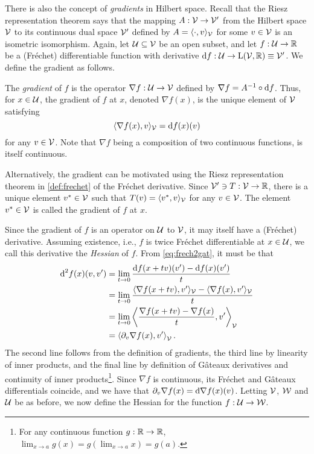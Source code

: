 There is also the concept of \emph{gradients} in Hilbert space.
Recall that the Riesz representation theorem says that the mapping $A:{\mathcal V}\to{\mathcal V}'$ from the Hilbert space ${\mathcal V}$ to its continuous dual space ${\mathcal V}'$ defined by $A = \langle\cdot,v\rangle_{\mathcal V}$ for some $v\in{\mathcal V}$ is an isometric isomorphism.
Again, let ${\mathcal U} \subseteq {\mathcal V}$ be an open subset, and let $f:{\mathcal U}\to\mathbb{R}$ be a (Fréchet) differentiable function with derivative $\text{d} f: {\mathcal U} \to \text{L}({\mathcal V},\mathbb{R}) \equiv {\mathcal V}'$.
We define the gradient as follows.

\begin{definition}
  The \emph{gradient} of $f$ is the operator $\nabla f: {\mathcal U} \to {\mathcal V}$ defined by $\nabla f = A^{-1} \circ \text{d} f$.
  Thus, for $x \in {\mathcal U}$, the gradient of $f$ at $x$, denoted $\nabla f(x)$, is the unique element of ${\mathcal V}$ satisfying
  \[
    \langle\nabla f(x), v\rangle_{\mathcal V} = \text{d} f(x)(v)
  \]
  for any $v \in {\mathcal V}$.
  Note that $\nabla f$ being a composition of two continuous functions, is itself continuous.
\end{definition}

\begin{remark}
  Alternatively, the gradient can be motivated using the Riesz representation theorem in \cref{def:frechet} of the Fréchet derivative.
  Since ${\mathcal V}'\ni T:{\mathcal V}\to\mathbb{R}$, there is a unique element $v^*\in{\mathcal V}$ such that $T(v)=\langle v^*,v\rangle_{\mathcal V}$ for any $v\in{\mathcal V}$.
  The element $v^*\in{\mathcal V}$ is called the gradient of $f$ at $x$.
\end{remark}

Since the gradient of $f$ is an operator on ${\mathcal U}$ to ${\mathcal V}$, it may itself have a (Fréchet) derivative.
Assuming existence, i.e., $f$ is twice Fréchet differentiable at $x \in {\mathcal U}$, we call this derivative the \emph{Hessian} of $f$.
From \cref{eq:frech2gat}, it must be that
\begin{align*}
  \d^2 f(x)(v,v') &= \lim_{t\to 0} \frac{\d f(x + t v)(v') - \d f(x)(v')}{t} \\
  &= \lim_{t\to 0} \frac{\ip{\nabla f(x+tv), v'}_\cV - \ip{\nabla f(x), v'}_\cV}{t} \\
  &= \lim_{t\to 0} \left\langle \frac{\nabla f(x+tv) - \nabla f(x)}{t} , v' \right\rangle_\cV \\%
  &= \left\langle \partial_v \nabla f(x) , v' \right\rangle_\cV.
\end{align*}
The second line follows from the definition of gradients, the third line by linearity of inner products, and the final line by definition of Gâteaux derivatives and continuity of inner products\footnote{For any continuous function $g:\mathbb{R}\to\mathbb{R}$, $\lim_{x\to a} g(x) = g(\lim_{x\to a} x) = g(a)$.}.
Since $\nabla f$ is continuous, its Fréchet and Gâteaux differentials coincide, and we have that $\partial_v \nabla f(x) = \text{d} \nabla f(x) (v)$.
Letting ${\mathcal V}$, ${\mathcal W}$ and ${\mathcal U}$ be as before, we now define the Hessian for the function $f:{\mathcal U} \to {\mathcal W}$.

